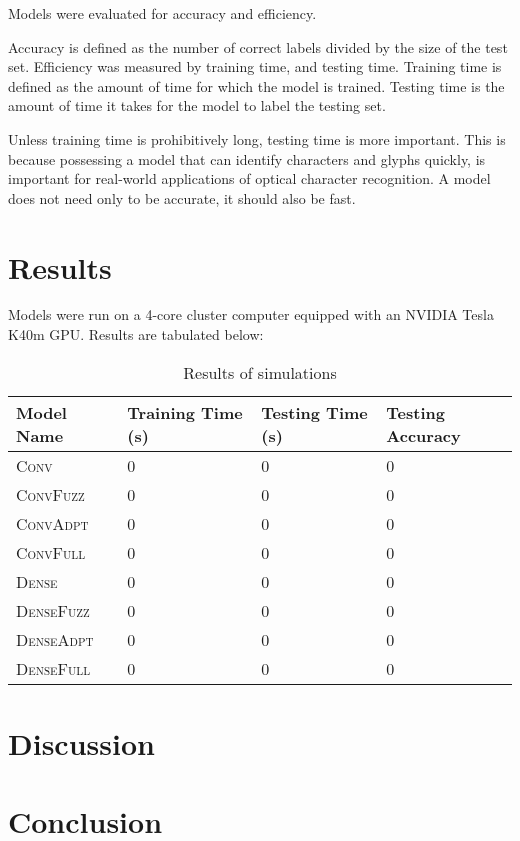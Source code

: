 \documentclass{article}
\begin{document}
Models were evaluated for accuracy and efficiency.

Accuracy is defined as the number of correct labels divided by the size of the test set.
Efficiency was measured by training time, and testing time.
Training time is defined as the amount of time for which the model is trained.
Testing time is the amount of time it takes for the model to label the testing set.

Unless training time is prohibitively long, testing time is more important.
This is because possessing a model that can identify characters and glyphs quickly,
is important for real-world applications of optical character recognition.
A model does not need only to be accurate, it should also be fast.

\section{Results}

Models were run on a 4-core cluster computer equipped with an NVIDIA Tesla K40m GPU.
Results are tabulated below:

\begin{table}
  \caption{Results of simulations}
  \label{tbl:results}
  \centering
  \begin{tabular}{llll}
    \toprule
    Model Name & Training Time (s) & Testing Time (s) & Testing Accuracy \\
    \midrule
    \textsc{Conv}         & 0 & 0 & 0 \\
    \textsc{ConvFuzz}     & 0 & 0 & 0 \\
    \textsc{ConvAdpt}     & 0 & 0 & 0 \\
    \textsc{ConvFull}     & 0 & 0 & 0 \\
    \textsc{Dense}        & 0 & 0 & 0 \\
    \textsc{DenseFuzz}    & 0 & 0 & 0 \\
    \textsc{DenseAdpt}    & 0 & 0 & 0 \\
    \textsc{DenseFull}    & 0 & 0 & 0 \\
    \bottomrule
  \end{tabular}
\end{table}

\section{Discussion}

\section{Conclusion}


\end{document}
